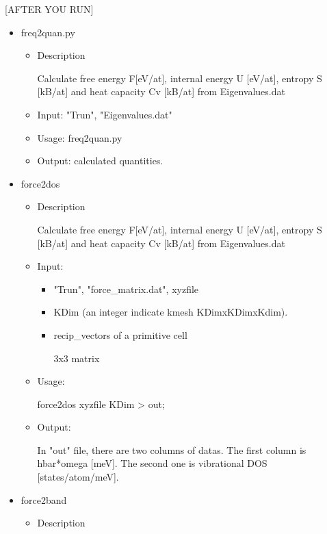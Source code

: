 \documentclass[11pt]{article}
\begin{document}
[AFTER YOU RUN] 
\begin{itemize}
\item freq2quan.py

\begin{itemize}
\item Description

Calculate free energy F[eV/at], internal energy U [eV/at], entropy S [kB/at] 
and heat capacity Cv [kB/at] from Eigenvalues.dat

\item Input: "Trun", "Eigenvalues.dat"

\item Usage: freq2quan.py

\item Output: calculated quantities.
\end{itemize}

\item force2dos

\begin{itemize}
\item Description

Calculate free energy F[eV/at], internal energy U [eV/at], entropy S [kB/at] 
and heat capacity Cv [kB/at] from Eigenvalues.dat

\item Input: 

\begin{itemize}
\item "Trun", "force\_matrix.dat", xyzfile

\item KDim (an integer indicate kmesh KDimxKDimxKdim).

\item recip\_vectors of a primitive cell

3x3 matrix
\end{itemize}

\item Usage: 

force2dos xyzfile KDim > out;

\item Output: 

In "out" file, there are two columns of datas.
The first column is hbar*omega [meV].
The second one is vibrational DOS [states/atom/meV].
\end{itemize}

\item force2band

\begin{itemize}
\item Description


\end{itemize}
\end{itemize}
\end{document}
